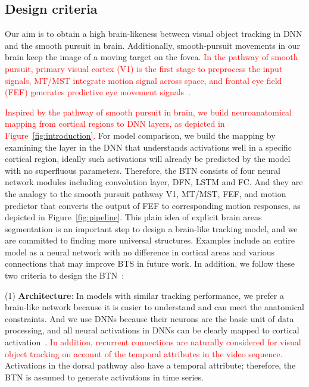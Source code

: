 \documentclass[sn-mathphys]{sn-jnl}%
\theoremstyle{thmstyleone}%
\theoremstyle{thmstyletwo}%
\theoremstyle{thmstylethree}%
\begin{document}
\subsection{Design criteria}
Our aim is to obtain a high brain-likeness between visual object tracking in DNN and the smooth pursuit in brain.
Additionally, smooth-pursuit movements in our brain keep the image of a moving target on the fovea. 
\textcolor{red}{
	In the pathway of smooth pursuit,
	primary visual cortex (V1) is the first stage to preprocess the input signals, 
	MT/MST \textcolor{red}{integrate} motion signal across space,
	and frontal eye field (FEF) generates predictive eye movement signals~\cite{b11,b13,b14}.
}\par

\textcolor{red}{
	Inspired by the pathway of smooth pursuit in brain, we build neuroanatomical mapping from cortical regions to DNN layers, as depicted in Figure~\ref{fig:introduction}.}
For model comparison, we build the mapping by examining the layer in the DNN that understands activations well in a specific cortical region, 
ideally such activations will already be predicted by the model with no superfluous parameters. 
Therefore, the BTN consists of four neural network modules including convolution layer, DFN, LSTM and FC.
And they are the analogy to the smooth pursuit pathway V1, MT/MST, FEF, 
and motion predictor that converts the output of FEF to corresponding motion responses, as depicted in Figure~\ref{fig:pipeline}. 
This plain idea of explicit brain areas segmentation is an important step to design a brain-like tracking model, 
and we are committed to finding more universal structures. 
Examples include an entire model as a neural network with no difference in cortical areas
and various connections that may improve BTS in future work.
In addition, we follow these two criteria to design the BTN~\cite{kubilius2018predict}:

(1) \textbf{Architecture}: In models with similar tracking performance, we prefer a brain-like network because it is easier to understand and can meet the anatomical constraints.
And we use DNNs because their neurons are the basic unit of data processing, 
and all neural activations in DNNs can be clearly mapped to cortical activation~\cite{yamins2016using}.
\textcolor{red}{
	In addition, recurrent connections are naturally considered for visual object tracking on account of the temporal attributes in the video sequence.}
Activations in the dorsal pathway also have a temporal attribute; 
therefore, the BTN is assumed to generate activations in time series.
\end{document}
